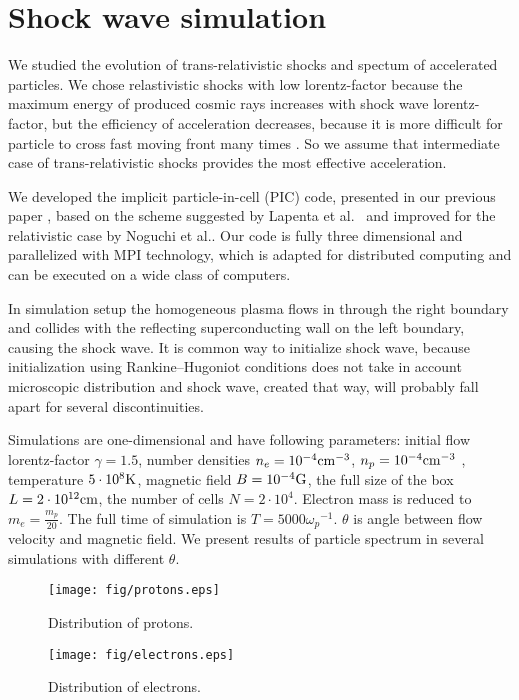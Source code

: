\section{Shock wave simulation}
We studied the evolution of trans-relativistic shocks and spectum of accelerated particles. We chose relastivistic shocks with low lorentz-factor because the maximum energy of produced cosmic rays increases with shock wave lorentz-factor, but the efficiency of acceleration decreases, because it is more difficult for particle to cross fast moving front many times \cite{Ellison2013}. So we assume that intermediate case of trans-relativistic shocks provides the most effective acceleration.

We developed the implicit particle-in-cell (PIC) code, presented in our previous paper \cite{Romansky2016}, based on the scheme suggested by Lapenta et al.~\cite{Lapenta2006} and improved for the relativistic case by Noguchi et al.\cite{Noguchi2007}.
Our code is fully three dimensional and parallelized with MPI technology, which is adapted for distributed computing and can be executed on a wide class of computers.

In simulation setup the homogeneous plasma flows in through the right boundary
and collides with the reflecting superconducting wall on the left boundary, causing the shock wave. It is common way to initialize shock wave, because initialization using Rankine–Hugoniot conditions does not take in account microscopic distribution and shock wave, created that way, will probably fall apart for several discontinuities.
  
  Simulations are one-dimensional and have following parameters: initial flow lorentz-factor $\gamma = 1.5$, number densities $n_e = 10^{-4} \rm{cm}^{-3}$, $n_p = 10^{-4} \rm{cm}^{-3}$ , temperature $5\cdot10^8 \rm{K}$, magnetic field $B = 10^{-4} \rm{G}$, the full size of the box $L = 2\cdot10^{12} \rm{cm}$, the number of cells $N=2\cdot10^4$. Electron mass is reduced to $m_e = \frac{m_p}{20}$. The full time of simulation is $T = 5000 {\omega_p}^{-1}$. $\theta$ is angle between flow velocity and magnetic field. We present results of particle spectrum in several simulations with different $\theta$. 

\begin{figure}[h!]
	\centering
	\texttt{[image: fig/protons.eps]} 
	\caption{Distribution of protons.}
	\label{protons}
\end{figure}
\begin{figure}[h!]
	\centering
	\texttt{[image: fig/electrons.eps]} 
	\caption{Distribution of electrons.}
	\label{electrons}
\end{figure}

